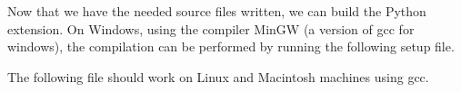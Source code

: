 

Now that we have the needed source files written, we can build the Python extension.
On Windows, using the compiler MinGW (a version of gcc for windows), the compilation can be performed by running the following setup file.



The following file should work on Linux and Macintosh machines using gcc.








